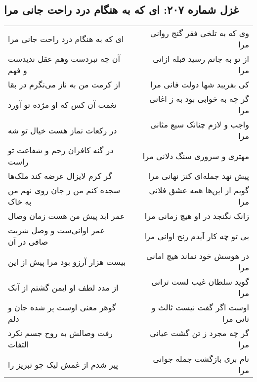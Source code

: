 \begin{center}
\section*{غزل شماره ۲۰۷: ای که به هنگام درد راحت جانی مرا}
\label{sec:0207}
\begin{longtable}{l p{0.5cm} r}
ای که به هنگام درد راحت جانی مرا
&&
وی که به تلخی فقر گنج روانی مرا
\\
آن چه نبردست وهم عقل ندیدست و فهم
&&
از تو به جانم رسید قبله ازانی مرا
\\
از کرمت من به ناز می‌نگرم در بقا
&&
کی بفریبد شها دولت فانی مرا
\\
نغمت آن کس که او مژده تو آورد
&&
گر چه به خوابی بود به ز اغانی مرا
\\
در رکعات نماز هست خیال تو شه
&&
واجب و لازم چنانک سبع مثانی مرا
\\
در گنه کافران رحم و شفاعت تو راست
&&
مهتری و سروری سنگ دلانی مرا
\\
گر کرم لایزال عرضه کند ملک‌ها
&&
پیش نهد جمله‌ای کنز نهانی مرا
\\
سجده کنم من ز جان روی نهم من به خاک
&&
گویم از این‌ها همه عشق فلانی مرا
\\
عمر ابد پیش من هست زمان وصال
&&
زانک نگنجد در او هیچ زمانی مرا
\\
عمر اوانی‌ست و وصل شربت صافی در آن
&&
بی تو چه کار آیدم رنج اوانی مرا
\\
بیست هزار آرزو بود مرا پیش از این
&&
در هوسش خود نماند هیچ امانی مرا
\\
از مدد لطف او ایمن گشتم از آنک
&&
گوید سلطان غیب لست ترانی مرا
\\
گوهر معنی اوست پر شده جان و دلم
&&
اوست اگر گفت نیست ثالث و ثانی مرا
\\
رفت وصالش به روح جسم نکرد التفات
&&
گر چه مجرد ز تن گشت عیانی مرا
\\
پیر شدم از غمش لیک چو تبریز را
&&
نام بری بازگشت جمله جوانی مرا
\\
\end{longtable}
\end{center}
